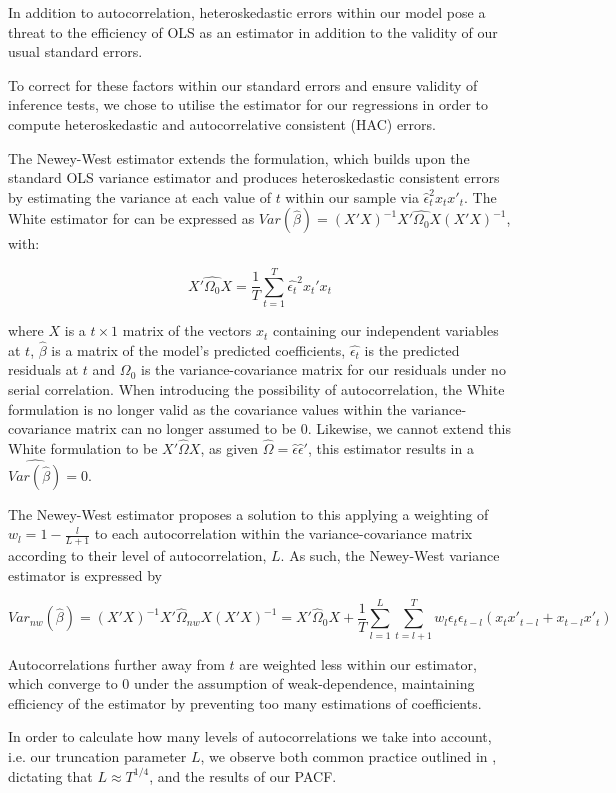 \documentclass[12pt]{article}
\numberwithin{table}{section}   %
\begin{document}
In addition to autocorrelation, heteroskedastic errors within our model pose a threat to the efficiency of OLS as an estimator in addition to the validity of our usual standard errors.

To correct for these factors within our standard errors and ensure validity of inference tests, we chose to utilise the \citet{newey} estimator for our regressions in order to compute heteroskedastic and autocorrelative consistent (HAC) errors.

The Newey-West estimator extends the \citet{white} formulation, which builds upon the standard OLS variance estimator and produces heteroskedastic consistent errors by estimating the variance at each value of $t$ within our sample via $\hat{\epsilon}^2_tx_tx'_t$. The White estimator for can be expressed as $Var(\hat{\beta})=(X'X)^{-1}X'\hat{\Omega_0}X(X'X)^{-1}$, with:

$$
X'\hat{\Omega_0}X=\frac{1}{T}\sum_{t=1}^T\hat{\epsilon_t}^2x_t'x_t
$$

where $X$ is a $t\times1$ matrix of the vectors $x_t$ containing our independent variables at $t$, $\hat{\beta}$ is a matrix of the model’s predicted coefficients, $\hat{\epsilon_t}$ is the predicted residuals at $t$ and $\Omega_0$ is the variance-covariance matrix for our residuals under no serial correlation. When introducing the possibility of autocorrelation, the White formulation is no longer valid as the covariance values within the variance-covariance matrix can no longer assumed to be 0. Likewise, we cannot extend this White formulation to be $X'\hat{\Omega}X$, as given $\hat{\Omega}=\hat{\epsilon}\hat{\epsilon}'$, this estimator results in a $\widehat{Var(\hat{\beta})}=0$.

The Newey-West estimator proposes a solution to this applying a weighting of $w_l=1-\frac{l}{L+1}$ to each autocorrelation within the variance-covariance matrix according to their level of autocorrelation, $L$. As such, the Newey-West variance estimator is expressed by

$$
\widehat{Var_{nw}(\hat{\beta})}=(X'X)^{-1}X'\hat{\Omega}_{nw}X(X'X)^{-1}=X'\hat{\Omega}_0X+\frac{1}{T}\sum^L_{l=1}\sum^T_{t=l+1}w_l\epsilon_t\epsilon_{t-l}(x_tx'_{t-l}+x_{t-l}x'_t)
$$

Autocorrelations further away from $t$ are weighted less within our estimator, which converge to 0 under the assumption of weak-dependence, maintaining efficiency of the estimator by preventing too many estimations of coefficients.

In order to calculate how many levels of autocorrelations we take into account, i.e. our truncation parameter $L$, we observe both common practice outlined in \cite{greene}, dictating that $L\approx{T^{1/4}}$, and the results of our PACF.
\end{document}
